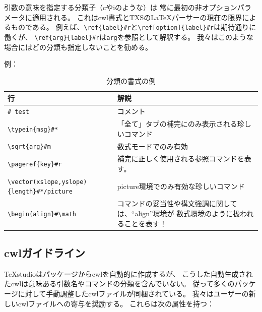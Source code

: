 引数の意味を指定する分類子（cやiのような）は
常に最初の非オプションパラメータに適用される。
これはcwl書式とTXSのLaTeXパーサーの現在の限界によるものである。
例えば、\verb+\ref{label}#r+と\verb+\ref[option]{label}#r+は期待通りに働くが、
\verb+\ref{arg}{label}#r+は\verb+arg+を参照として解釈する。
我々はこのような場合にはどの分類も指定しないことを勧める。

例：

\begin{table}[H]
  \centering
  \caption{分類の書式の例}
  \begin{tabularx}{\linewidth}{lX}
    \hline
    \textbf{行} & \textbf{解説}\\
    \hline
    \verb+# test+ & コメント\\
    \verb+\typein+\verb+{msg}#*+ & 「全て」タブの補完にのみ表示される珍しいコマンド\\
    \verb+\sqrt+\verb+{arg}#m+ & 数式モードでのみ有効\\
    \verb+\pageref+\verb+{key}#r+ & 補完に正しく使用される参照コマンドを表す。\\
    \verb+\vector+\verb+(xslope,yslope){length}#*/picture+
      & picture環境でのみ有効な珍しいコマンド\\
    \verb+\begin+\verb+{align}#\math+
      & コマンドの妥当性や構文強調に関しては、``align''環境が
      数式環境のように扱われることを表す！\\
    \hline
  \end{tabularx}
\end{table}

\subsection{cwlガイドライン}

TeXstudioはパッケージからcwlを自動的に作成するが、
こうした自動生成されたcwlは意味ある引数名やコマンドの分類を含んでいない。
従って多くのパッケージに対して手動調整したcwlファイルが同梱されている。
我々はユーザーの新しいcwlファイルへの寄与を奨励する。
これらは次の属性を持つ：

